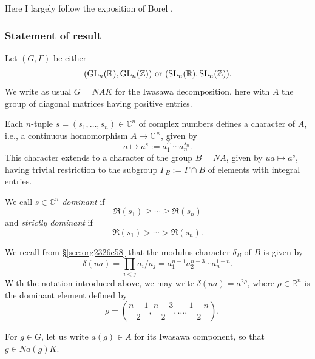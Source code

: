 \documentclass[reqno]{amsart} 
\begin{document}
Here I largely follow the exposition of Borel \cite[\S11--12]{MR2331343}.


\subsubsection{Statement of result}
Let $(G,\Gamma)$ be either
\begin{equation*}
  (\operatorname{GL}_n(\mathbb{R}), \operatorname{GL}_n(\mathbb{Z})) \text{ or } (\operatorname{SL}_n(\mathbb{R}), \operatorname{SL}_n(\mathbb{Z})).
\end{equation*}
We write as usual $G = N A K$ for the Iwasawa decomposition, here with $A$ the group of diagonal matrices having positive entries.


Each $n$-tuple $s = (s_1,\dotsc,s_n) \in \mathbb{C}^n$ of complex numbers defines a character of $A$, i.e., a continuous homomorphism $A \rightarrow \mathbb{C}^\times$, given by
\begin{equation*}
  a \mapsto a^s := a_1^{s_1} \dotsb a_n^{s_n}.
\end{equation*}
This character extends to a character of the group $B = N A$, given by $u a \mapsto a^s$, having trivial restriction to the subgroup $\Gamma_B := \Gamma \cap B$ of elements with integral entries.

\begin{definition}
  We call $s \in \mathbb{C}^n$ \emph{dominant} if
  \begin{equation*}
    \Re(s_1) \geq \dotsb \geq \Re(s_n)
  \end{equation*}
  and \emph{strictly dominant} if
  \begin{equation*}
    \Re(s_1) > \dotsb > \Re(s_n).
  \end{equation*}
\end{definition}

We recall from \S\ref{sec:org2326c58} that the modulus character $\delta_B$ of $B$ is given by
\begin{equation*}
  \delta(u a) = \prod_{i < j} a_i / a_j = a_1^{n-1} a_2^{n-3} \dotsb a_n^{1-n}.
\end{equation*}
With the notation introduced above, we may write $\delta(u a) = a^{2 \rho}$, where $\rho \in \mathbb{R}^n$ is the dominant element defined by
\begin{equation*}
  \quad \rho = \left( \frac{n-1}{2}, \frac{n-3}{2}, \dotsc, \frac{1-n}{2} \right).
\end{equation*}

For $g \in G$, let us write $a(g) \in A$ for its Iwasawa component, so that $g \in N a(g) K$.
\end{document}
